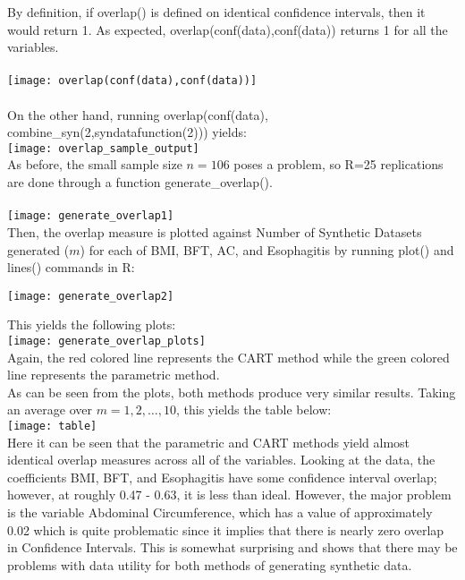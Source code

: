 \documentclass[12pt]{article}
\begin{document}
By definition, if overlap() is defined on identical confidence intervals, then it would return 1. As expected, overlap(conf(data),conf(data)) returns 1 for all the variables. \\\\
\texttt{[image: overlap(conf(data),conf(data))]}\\\\
On the other hand, running overlap(conf(data), combine\_syn(2,syndatafunction(2))) yields:\\
\texttt{[image: overlap\_sample\_output]}\\

As before, the small sample size $n=106$ poses a problem, so R=25 replications are done through a function generate\_overlap(). \\\\
\texttt{[image: generate\_overlap1]}\\

Then, the overlap measure is plotted against Number of Synthetic Datasets generated ($m$) for each of BMI, BFT, AC, and Esophagitis by running plot() and lines() commands in R:\\
\begin{center}
	\texttt{[image: generate\_overlap2]}\\
\end{center}
This yields the following plots:\\
\texttt{[image: generate\_overlap\_plots]}\\
Again, the red colored line represents the CART method while the green colored line represents the parametric method.\\

As can be seen from the plots, both methods produce very similar results. Taking an average over $m=1,2,\dots, 10$, this yields the table below: \\
\texttt{[image: table]}\\

Here it can be seen that the parametric and CART methods yield almost identical overlap measures across all of the variables. Looking at the data, the coefficients BMI, BFT, and Esophagitis have some confidence interval overlap; however, at roughly 0.47 - 0.63, it is less than ideal. However, the major problem is the variable Abdominal Circumference, which has a value of approximately 0.02 which is quite problematic since it implies that there is nearly zero overlap in Confidence Intervals. This is somewhat surprising and shows that there may be problems with data utility for both methods of generating synthetic data. \\
\end{document}
